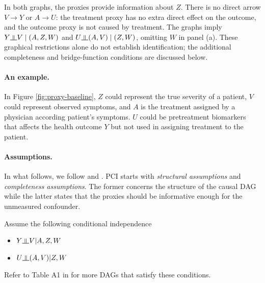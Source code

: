 \documentclass[11pt,twoside]{article}
\begin{document}
In both graphs, the proxies provide information about $Z$. There is no direct arrow $V\to Y$ or $A\to U$: the treatment proxy has no extra direct effect on the outcome, and the outcome proxy is not caused by treatment. The graphs imply $Y\indep V\mid(A,Z,W)$ and $U\indep(A,V)\mid(Z,W)$, omitting $W$ in panel (a). These graphical restrictions alone do not establish identification; the additional completeness and bridge-function conditions are discussed below.

\paragraph{An example.} In Figure \ref{fig:proxy-baseline}, $Z$ could represent the true severity of a patient, $V$ could represent observed symptoms, and $A$ is the treatment assigned by a physician according patient's symptoms. $U$ could be pretreatment biomarkers that affects the health outcome $Y$ but not used in assigning treatment to the patient.

\paragraph{Assumptions.} In what follows, we follow \cite{mastouri2021proximal} and \cite{tchetgen2020introduction}. PCI starts with \emph{structural assumptions} and \emph{completeness assumptions}. The former concerns the structure of the causal DAG while the latter states that the proxies should be informative enough for the unmeasured confounder.

\begin{assumption}
\label{ass:str}
Assume the following conditional independence
\begin{itemize}
    \item[(i)] $Y\indep V|A,Z,W$
    \item[(ii)] $U \indep (A, V)| Z, W$
\end{itemize}
\end{assumption}

Refer to Table A1 in \cite{tchetgen2020introduction} for more DAGs that satisfy these conditions.
\end{document}
